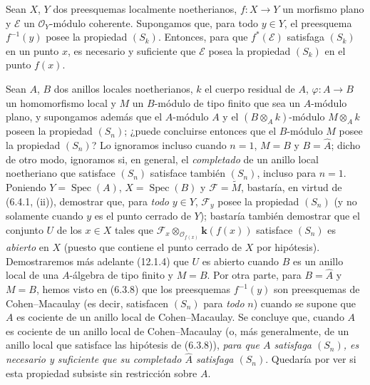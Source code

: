 \begin{corollary}[6.4.2]
\label{IV.2.s6.4.2-fr}
Sean $X$, $Y$ dos preesquemas localmente noetherianos, $f:X\to Y$ un
morfismo plano y $\mathscr E$ un $\mathcal O_Y$-módulo coherente. Supongamos
que, para todo $y\in Y$, el preesquema $f^{-1}(y)$ posee la propiedad $(S_k)$.
Entonces, para que $f^*(\mathscr E)$ satisfaga $(S_k)$ en un punto $x$, es
necesario y suficiente que $\mathscr E$ posea la propiedad $(S_k)$ en el punto
$f(x)$.
\end{corollary}

\begin{remark}[6.4.3]
\label{IV.2.s6.4.3-fr}
Sean $A$, $B$ dos anillos locales noetherianos, $k$ el cuerpo residual de
$A$, $\varphi:A\to B$ un homomorfismo local y $M$ un $B$-módulo de tipo finito
que sea un $A$-módulo plano, y supongamos además que el $A$-módulo $A$ y el
$(B\otimes_Ak)$-módulo $M\otimes_Ak$ poseen la propiedad $(S_n)$; ¿puede
concluirse entonces que el $B$-módulo $M$ posee la propiedad $(S_n)$? Lo
ignoramos incluso cuando $n=1$, $M=B$ y $B=\widehat A$; dicho de otro modo,
ignoramos si, en general, el \emph{completado} de un anillo local noetheriano
que satisface $(S_n)$ satisface también $(S_n)$, incluso para $n=1$. Poniendo
$Y=\operatorname{Spec}(A)$, $X=\operatorname{Spec}(B)$ y
$\mathscr F=\widetilde M$, bastaría, en virtud de (6.4.1, (ii)), demostrar que,
para \emph{todo} $y\in Y$, $\mathscr F_y$ posee la propiedad $(S_n)$
(y no solamente cuando $y$ es el punto cerrado de $Y$); bastaría también
demostrar que el conjunto $U$ de los $x\in X$ tales que
$\mathscr F_x\otimes_{\mathcal O_{f(x)}}\boldsymbol{k}(f(x))$ satisface $(S_n)$ es \emph{abierto}
en $X$ (puesto que contiene el punto cerrado de $X$ por hipótesis).
Demostraremos más adelante (12.1.4) que $U$ es abierto cuando $B$ es un anillo
local de una $A$-álgebra de tipo finito y $M=B$. Por otra parte, para
$B=\widehat A$ y $M=B$, hemos visto en (6.3.8) que los preesquemas
$f^{-1}(y)$ son preesquemas de Cohen--Macaulay (es decir, satisfacen
$(S_n)$ para \emph{todo} $n$) cuando se supone que $A$ es cociente de un
anillo local de Cohen--Macaulay. Se concluye que, cuando $A$ es cociente de
un anillo local de Cohen--Macaulay (o, más generalmente, de un anillo local
que satisface las hipótesis de (6.3.8)), \emph{para que $A$ satisfaga $(S_n)$,
es necesario y suficiente que su completado $\widehat A$ satisfaga $(S_n)$}.
Quedaría por ver si esta propiedad subsiste sin restricción sobre $A$.
\end{remark}

